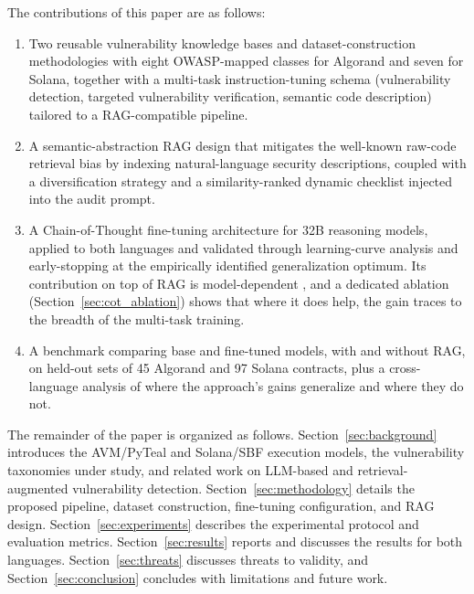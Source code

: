 \documentclass[lettersize,journal]{IEEEtran}
\begin{document}
The contributions of this paper are as follows:
\begin{enumerate}
    \item Two reusable vulnerability knowledge bases and dataset-construction 
    methodologies with eight OWASP-mapped classes for Algorand and seven for Solana, 
    together with a multi-task instruction-tuning schema (vulnerability detection, 
targeted vulnerability verification, semantic code description) tailored to a RAG-compatible
pipeline.
    \item A semantic-abstraction RAG design that mitigates the well-known raw-code
    retrieval bias by indexing natural-language security descriptions, coupled with a
diversification strategy and a similarity-ranked dynamic checklist injected into the audit prompt.
    \item A Chain-of-Thought fine-tuning architecture for 32B reasoning models, applied to both
    languages and validated through learning-curve analysis and early-stopping
    at the empirically identified generalization optimum. 
    Its contribution on top of RAG is
    model-dependent 
    , and a
    dedicated ablation (Section~\ref{sec:cot_ablation}) shows that where 
    it does help, the gain traces
    to the breadth of the multi-task training.
\item A benchmark comparing base and fine-tuned models, with and without RAG, on held-out sets of 45
    Algorand and 97 Solana contracts, plus a cross-language analysis of where the approach's gains 
    generalize and where they do not.
\end{enumerate}

The remainder of the paper is organized as follows. Section~\ref{sec:background} introduces the 
AVM/PyTeal and Solana/SBF execution models, the vulnerability taxonomies under study, 
and related work on LLM-based and retrieval-augmented vulnerability detection.
Section~\ref{sec:methodology} details the proposed pipeline, dataset construction, 
fine-tuning configuration, and RAG design. Section~\ref{sec:experiments} describes 
the experimental protocol and evaluation metrics. Section~\ref{sec:results} reports 
and discusses the results for both languages. Section~\ref{sec:threats} discusses 
threats to validity, and Section~\ref{sec:conclusion} concludes with limitations and future work.
\end{document}
